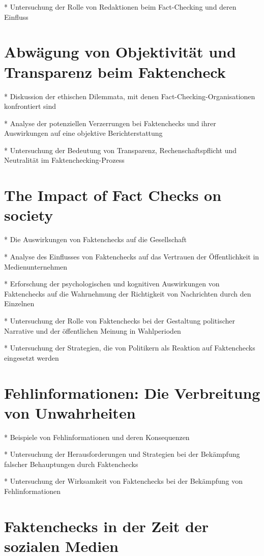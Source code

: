 \documentclass[a4paper,listof=totoc,bibliography=totoc]{scrartcl}
\begin{document}
* Untersuchung der Rolle von Redaktionen beim Fact-Checking und deren Einfluss

\section{Abwägung von Objektivität und Transparenz beim Faktencheck}

* Diskussion der ethischen Dilemmata, mit denen Fact-Checking-Organisationen konfrontiert sind

* Analyse der potenziellen Verzerrungen bei Faktenchecks und ihrer Auswirkungen auf eine objektive Berichterstattung

* Untersuchung der Bedeutung von Transparenz, Rechenschaftspflicht und Neutralität im Faktenchecking-Prozess

\section{The Impact of Fact Checks on society}

* Die Auswirkungen von Faktenchecks auf die Gesellschaft

* Analyse des Einflusses von Faktenchecks auf das Vertrauen der Öffentlichkeit in Medienunternehmen

* Erforschung der psychologischen und kognitiven Auswirkungen von Faktenchecks auf die Wahrnehmung der Richtigkeit von Nachrichten durch den Einzelnen

* Untersuchung der Rolle von Faktenchecks bei der Gestaltung politischer Narrative und der öffentlichen Meinung in Wahlperioden

* Untersuchung der Strategien, die von Politikern als Reaktion auf Faktenchecks eingesetzt werden

\section{Fehlinformationen: Die Verbreitung von Unwahrheiten}

* Beispiele von Fehlinformationen und deren Konsequenzen

* Untersuchung der Herausforderungen und Strategien bei der Bekämpfung falscher Behauptungen durch Faktenchecks

* Untersuchung der Wirksamkeit von Faktenchecks bei der Bekämpfung von Fehlinformationen

\section{Faktenchecks in der Zeit der sozialen Medien}
\end{document}
